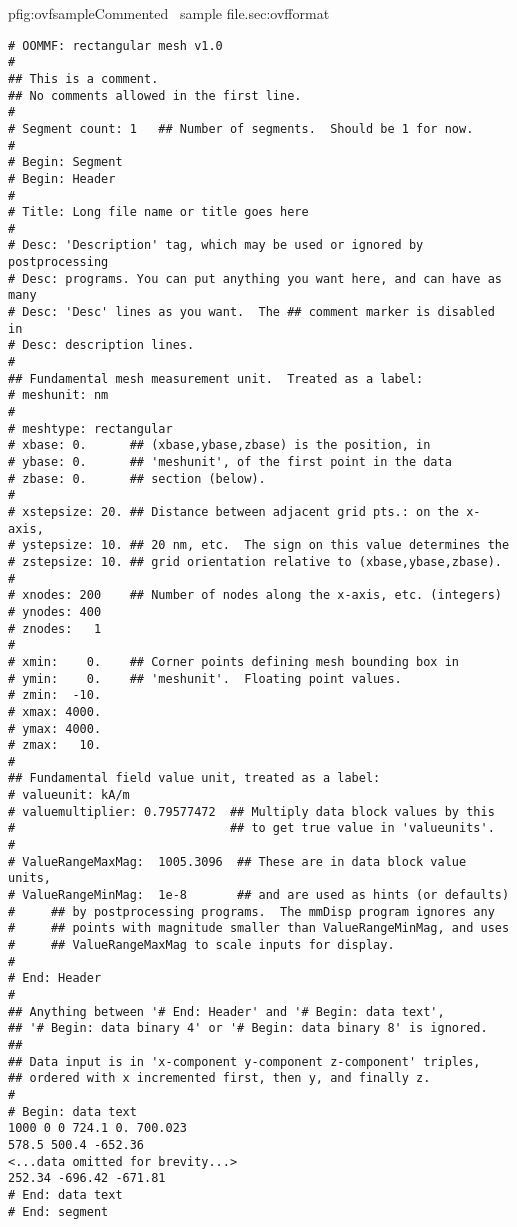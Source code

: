 \begin{codelisting}{p}{fig:ovfsample}{Commented \OVF\ sample
file.}{sec:ovfformat}
\begin{verbatim}
# OOMMF: rectangular mesh v1.0
#
## This is a comment.
## No comments allowed in the first line.
#
# Segment count: 1   ## Number of segments.  Should be 1 for now.
#
# Begin: Segment
# Begin: Header
#
# Title: Long file name or title goes here
#
# Desc: 'Description' tag, which may be used or ignored by postprocessing
# Desc: programs. You can put anything you want here, and can have as many
# Desc: 'Desc' lines as you want.  The ## comment marker is disabled in
# Desc: description lines. 
#
## Fundamental mesh measurement unit.  Treated as a label:
# meshunit: nm
#
# meshtype: rectangular
# xbase: 0.      ## (xbase,ybase,zbase) is the position, in
# ybase: 0.      ## 'meshunit', of the first point in the data
# zbase: 0.      ## section (below).
#
# xstepsize: 20. ## Distance between adjacent grid pts.: on the x-axis,
# ystepsize: 10. ## 20 nm, etc.  The sign on this value determines the
# zstepsize: 10. ## grid orientation relative to (xbase,ybase,zbase).
#
# xnodes: 200    ## Number of nodes along the x-axis, etc. (integers)
# ynodes: 400
# znodes:   1
#
# xmin:    0.    ## Corner points defining mesh bounding box in
# ymin:    0.    ## 'meshunit'.  Floating point values.
# zmin:  -10.
# xmax: 4000.
# ymax: 4000.
# zmax:   10.
#
## Fundamental field value unit, treated as a label:
# valueunit: kA/m
# valuemultiplier: 0.79577472  ## Multiply data block values by this
#                              ## to get true value in 'valueunits'.
#
# ValueRangeMaxMag:  1005.3096  ## These are in data block value units,
# ValueRangeMinMag:  1e-8       ## and are used as hints (or defaults)
#     ## by postprocessing programs.  The mmDisp program ignores any
#     ## points with magnitude smaller than ValueRangeMinMag, and uses
#     ## ValueRangeMaxMag to scale inputs for display.
#
# End: Header
#
## Anything between '# End: Header' and '# Begin: data text',
## '# Begin: data binary 4' or '# Begin: data binary 8' is ignored.
##
## Data input is in 'x-component y-component z-component' triples,
## ordered with x incremented first, then y, and finally z.
#
# Begin: data text
1000 0 0 724.1 0. 700.023
578.5 500.4 -652.36
<...data omitted for brevity...>
252.34 -696.42 -671.81
# End: data text
# End: segment
\end{verbatim}
\end{codelisting}

